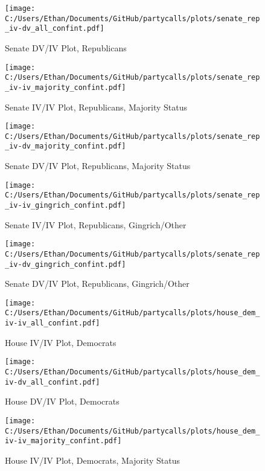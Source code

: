 \documentclass[12pt]{article}
\begin{document}
\begin{figure}[H]
	\centering
	\caption{Senate DV/IV Plot, Republicans}
	\texttt{[image: C:/Users/Ethan/Documents/GitHub/partycalls/plots/senate\_rep\_iv-dv\_all\_confint.pdf]}
\end{figure}

\begin{figure}[H]
	\centering
	\caption{Senate IV/IV Plot, Republicans, Majority Status}
	\texttt{[image: C:/Users/Ethan/Documents/GitHub/partycalls/plots/senate\_rep\_iv-iv\_majority\_confint.pdf]}
\end{figure}

\begin{figure}[H]
	\centering
	\caption{Senate DV/IV Plot, Republicans, Majority Status}
	\texttt{[image: C:/Users/Ethan/Documents/GitHub/partycalls/plots/senate\_rep\_iv-dv\_majority\_confint.pdf]}
\end{figure}

\begin{figure}[H]
	\centering
	\caption{Senate IV/IV Plot, Republicans, Gingrich/Other}
	\texttt{[image: C:/Users/Ethan/Documents/GitHub/partycalls/plots/senate\_rep\_iv-iv\_gingrich\_confint.pdf]}
\end{figure}

\begin{figure}[H]
	\centering
	\caption{Senate DV/IV Plot, Republicans, Gingrich/Other}
	\texttt{[image: C:/Users/Ethan/Documents/GitHub/partycalls/plots/senate\_rep\_iv-dv\_gingrich\_confint.pdf]}
\end{figure}

\begin{figure}[H]
	\centering
	\caption{House IV/IV Plot, Democrats}
	\texttt{[image: C:/Users/Ethan/Documents/GitHub/partycalls/plots/house\_dem\_iv-iv\_all\_confint.pdf]}
\end{figure}

\begin{figure}[H]
	\centering
	\caption{House DV/IV Plot, Democrats}
	\texttt{[image: C:/Users/Ethan/Documents/GitHub/partycalls/plots/house\_dem\_iv-dv\_all\_confint.pdf]}
\end{figure}

\begin{figure}[H]
	\centering
	\caption{House IV/IV Plot, Democrats, Majority Status}
	\texttt{[image: C:/Users/Ethan/Documents/GitHub/partycalls/plots/house\_dem\_iv-iv\_majority\_confint.pdf]}
\end{figure}
\end{document}
